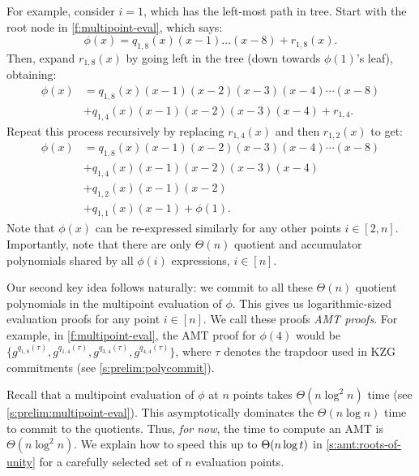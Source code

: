 For example, consider $i=1$, which has the left-most path in tree.
Start with the root node in \cref{f:multipoint-eval}, which says:
$$\phi(x)=q_{1,8}(x) (x-1)\dots(x-8) + r_{1,8}(x).$$
Then, expand $r_{1,8}(x)$ by going left in the tree (down towards $\phi(1)$'s leaf), obtaining:
\begin{align*}
\phi(x)& = q_{1,8}(x) (x-1)(x-2)(x-3)(x-4)\cdots(x-8) \\
       & + q_{1,4}(x) (x-1)(x-2)(x-3)(x-4) + r_{1,4}.
\end{align*}
Repeat this process recursively by replacing $r_{1,4}(x)$ and then $r_{1,2}(x)$ to get:
\begin{align*}
\phi(x)& = q_{1,8}(x) (x-1)(x-2)(x-3)(x-4)\cdots(x-8) \\
       & + q_{1,4}(x) (x-1)(x-2)(x-3)(x-4) \\
       & + q_{1,2}(x) (x-1)(x-2) \\
       & + q_{1,1}(x)(x-1) + \phi(1).
\end{align*}
Note that $\phi(x)$ can be re-expressed similarly for any other points $i\in [2,n]$.
Importantly, note that there are only $\Theta(n)$ quotient and accumulator polynomials shared by all $\phi(i)$ expressions, $i\in[n]$.

Our second key idea follows naturally: we commit to all these $\Theta(n)$ quotient polynomials in the multipoint evaluation of $\phi$.
This gives us logarithmic-sized evaluation proofs for any point $i\in[n]$.
We call these proofs \textit{AMT proofs}.
For example, in \cref{f:multipoint-eval}, the AMT proof for $\phi(4)$ would be $\{g^{q_{1,8}(\tau)}, g^{q_{1,4}(\tau)}, g^{q_{3,4}(\tau)}, g^{q_{4,4}(\tau)}\}$, where $\tau$ denotes the trapdoor used in KZG commitments (see \cref{s:prelim:polycommit}).

Recall that a multipoint evaluation of $\phi$ at $n$ points takes $\Theta(n\log^2{n})$ time (see \cref{s:prelim:multipoint-eval}).
This asymptotically dominates the $\Theta(n\log{n})$ time to commit to the quotients.
Thus, \textit{for now}, the time to compute an AMT is $\Theta(n\log^2{n})$.
We explain how to speed this up to $\Theta(n\log{t})$ in \cref{s:amt:roots-of-unity} for a carefully selected set of $n$ evaluation points.

